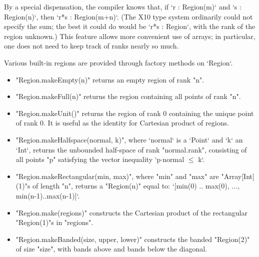 By a special dispensation, the compiler knows that, if \xcd`r : Region(m)` and
\xcd`s : Region(n)`, then \xcd`r*s : Region(m+n)`.  (The X10 type system
ordinarily could not specify the sum; the best it could do 
would be \xcd`r*s : Region`, with the rank of the region unknown.)  This
feature allows more convenient use of arrays; in particular, one does not need
to keep track of ranks nearly so much.





Various built-in regions are provided through  factory
methods on \xcd`Region`.  
\begin{itemize}
\item \xcd"Region.makeEmpty(n)" returns an empty region of rank \xcd"n".
\item \xcd"Region.makeFull(n)" returns the region containing all points of
      rank \xcd"n".  
\item \xcd"Region.makeUnit()" returns the region of rank 0 containing the
      unique point of rank 0.  It is useful as the identity for Cartesian
      product of regions.
\item \xcd"Region.makeHalfspace(normal, k)",
      where \xcd`normal` is a \xcd`Point` and \xcd`k` an \xcd`Int`, 
      returns the unbounded
      half-space of rank \xcd"normal.rank", consisting of all points \xcd"p"
      satisfying the vector inequality \xcdmath`p$\cdot$normal $\le$ k`.
\item \xcd"Region.makeRectangular(min, max)", 
      where \xcd"min" and \xcd"max"
      are \xcd"Array[Int](1)"s of length \xcd"n", returns a
      \xcd"Region(n)" equal to: 
      \xcdmath`[min(0) .. max(0), $\ldots$, min(n-1)..max(n-1)]`.
\item \xcd"Region.make(regions)" constructs the Cartesian product of the
      rectangular \xcd"Region(1)"s in \xcd"regions".
\item \xcd"Region.makeBanded(size, upper, lower)" constructs the
      banded \xcd"Region(2)" of size \xcd"size", with  bands above
      and  bands below the diagonal.

\end{itemize}
